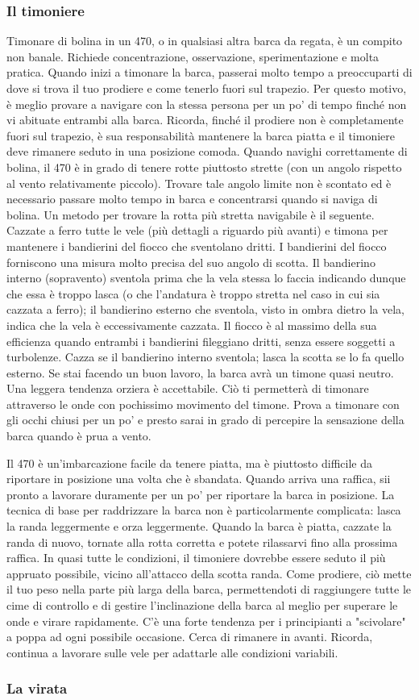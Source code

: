 \subsubsection{Il timoniere}
\label{subsubsec:IlTimoniere}
Timonare di bolina in un 470, o in qualsiasi altra barca da regata, è
un compito non banale. Richiede concentrazione, osservazione, sperimentazione e
molta pratica. Quando inizi a timonare la barca, passerai molto tempo a
preoccuparti di dove si trova il tuo prodiere e come tenerlo fuori sul trapezio.
Per questo motivo, è meglio provare a navigare con la stessa persona per un po'
di tempo finché non vi abituate entrambi alla barca. Ricorda, finché il prodiere
non è completamente fuori sul trapezio, è sua responsabilità mantenere la barca
piatta e il timoniere deve rimanere seduto in una posizione comoda. Quando
navighi correttamente di bolina, il 470 è in grado di tenere rotte piuttosto
strette (con un angolo rispetto al vento relativamente piccolo).
Trovare tale angolo limite non è scontato ed è necessario passare molto tempo in barca e concentrarsi
quando si naviga di bolina. Un metodo per trovare la rotta più stretta
navigabile è il seguente. Cazzate a ferro tutte le vele (più dettagli a
riguardo più avanti) e timona per mantenere i bandierini del fiocco che
sventolano dritti. I bandierini del fiocco forniscono una misura molto precisa
del suo angolo di scotta. Il bandierino interno (sopravento) sventola prima che
la vela stessa lo faccia indicando dunque che essa è troppo lasca (o che
l'andatura è troppo stretta nel caso in cui sia cazzata a ferro); il bandierino
esterno che sventola, visto in ombra dietro la vela,
indica che la vela è eccessivamente cazzata. Il fiocco è al massimo della sua efficienza quando
entrambi i bandierini fileggiano dritti, senza essere soggetti a turbolenze.
Cazza se il bandierino interno
sventola; lasca la scotta se lo fa quello esterno. Se stai facendo un buon
lavoro, la barca avrà un timone quasi neutro. Una leggera tendenza orziera è
accettabile. Ciò ti permetterà di timonare attraverso le onde con pochissimo
movimento del timone. Prova a timonare con gli occhi chiusi per un po' e presto
sarai in grado di percepire la sensazione della barca quando è prua a vento.

Il 470 è un'imbarcazione facile da tenere piatta, ma è piuttosto difficile da
riportare in posizione una volta che è sbandata. Quando arriva una raffica,
sii pronto a lavorare duramente per un po' per riportare la barca in posizione.
La tecnica di base per raddrizzare la barca non è particolarmente complicata: lasca
la randa leggermente e orza leggermente. Quando
la barca è piatta, cazzate la randa di nuovo, tornate alla rotta corretta e
potete rilassarvi fino alla prossima raffica. In quasi tutte le condizioni, il
timoniere dovrebbe essere seduto il più appruato possibile, vicino all'attacco
della scotta randa. Come
prodiere, ciò mette il tuo peso nella parte più larga della barca, permettendoti
di raggiungere tutte le cime di controllo e di gestire l'inclinazione della
barca al meglio per superare le onde e virare rapidamente. C'è una forte tendenza per
i principianti a "scivolare" a poppa ad ogni possibile occasione. Cerca di
rimanere in avanti. Ricorda, continua a lavorare sulle vele per adattarle alle
condizioni variabili.

\subsubsection{La virata}
\label{subsubsec:LaVirata}
